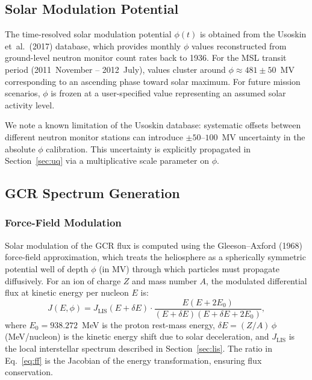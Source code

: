 \subsection{Solar Modulation Potential}
\label{sec:phi}

The time-resolved solar modulation potential $\phi(t)$ is obtained from the
Usoskin et~al.\ (2017) database, which provides monthly $\phi$ values
reconstructed from ground-level neutron monitor count rates
back to 1936.
For the MSL transit period (2011~November -- 2012~July), values cluster around
$\phi \approx 481 \pm 50$~MV corresponding to an ascending phase toward
solar maximum.
For future mission scenarios, $\phi$ is frozen at a user-specified
value representing an assumed solar activity level.

We note a known limitation of the Usoskin database: systematic offsets between
different neutron monitor stations can introduce $\pm 50$--$100$~MV uncertainty
in the absolute $\phi$ calibration.
This uncertainty is explicitly propagated in Section~\ref{sec:uq} via a
multiplicative scale parameter on $\phi$.

\subsection{GCR Spectrum Generation}
\label{sec:spectrum}

\subsubsection{Force-Field Modulation}
\label{sec:forcefield}

Solar modulation of the GCR flux is computed using the Gleeson--Axford (1968)
force-field approximation, which treats the heliosphere as a spherically
symmetric potential well of depth $\phi$ (in MV) through which particles must
propagate diffusively.
For an ion of charge $Z$ and mass number $A$, the modulated differential flux
at kinetic energy per nucleon $E$ is:
\begin{equation}
  J(E, \phi) = J_\mathrm{LIS}(E + \delta E)
  \cdot \frac{E(E + 2E_0)}{(E + \delta E)(E + \delta E + 2E_0)},
  \label{eq:ff}
\end{equation}
where $E_0 = 938.272$~MeV is the proton rest-mass energy,
$\delta E = (Z/A)\,\phi$ (MeV/nucleon) is the kinetic energy shift due to
solar deceleration, and $J_\mathrm{LIS}$ is the local interstellar spectrum
described in Section~\ref{sec:lis}.
The ratio in Eq.~\eqref{eq:ff} is the Jacobian of the energy transformation,
ensuring flux conservation.


